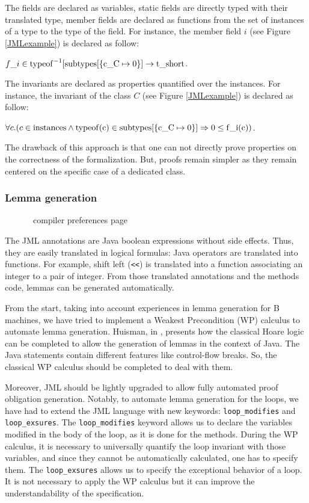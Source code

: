  The fields are declared as variables, static fields are directly typed with their translated type,
 member fields are declared as functions from the set of instances of a type to the type of the field.
 For instance, the member field $i$ (see Figure \ref{JMLexample}) is declared as follow:
 \begin{center}
 $f\_i \in \rm{typeof}^{-1}[\rm{subtypes}[\{c\_C \mapsto 0\}] \rightarrow \rm{t\_short}$.
 \end{center}

 The invariants are declared as properties quantified over the instances.
 For instance, the invariant of the class $C$ (see Figure \ref{JMLexample}) is declared as follow:
\begin{center}
 $\forall c.(c \in \rm{instances} \land \rm{typeof}(c) \in \rm{subtypes}[\{c\_C \mapsto 0\}] \Rightarrow 0 \le
f\_i(c))$.
\end{center}

 The drawback of this approach is that one can not directly prove properties on the correctness
 of the formalization.  But, proofs remain simpler as they remain
 centered on the specific case of a dedicated class.
\subsubsection{Lemma generation}
\begin{figure}[p]
 \caption{\JACK\ compiler preferences page}
 \label{JACKcompprefpage}
\end{figure}
 The JML annotations are Java boolean expressions without side
 effects.  Thus, they are easily translated in logical formulas: Java operators are
 translated into functions. For example, shift left (\texttt{<<}) is
 translated into a function associating an integer to a pair of
 integer.  From those translated annotations and the methods code,
 lemmas can be generated automatically.

 From the start, taking into account
 experiences in lemma generation for B machines, we have tried to
 implement a Weakest Precondition (WP) calculus to automate lemma
 generation.  Huisman, in \cite{Huisman:PhD}, presents how the
 classical Hoare logic can be completed to allow the generation of
 lemmas in the context of Java.  The Java statements contain different
 features like control-flow breaks.  So, the classical WP calculus
 should be completed to deal with them.

 Moreover, JML should be lightly upgraded to allow fully automated proof obligation generation.
 Notably, to
 automate lemma generation for the loops, we have had to extend
 the JML language with new keywords: \texttt{loop\_modifies} and \texttt{loop\_exsures}.
 The \texttt{loop\_modifies} keyword allows us to declare the variables modified in
the body of the loop, as it is done for the methods. During the WP calculus, it is necessary to universally
quantify the loop invariant with those variables, and since they cannot be automatically calculated, one has to
specify them.
 The \texttt{loop\_exsures} allows us to specify the exceptional behavior of a loop. It is not necessary to apply
the WP calculus but it can improve the understandability of the specification.

